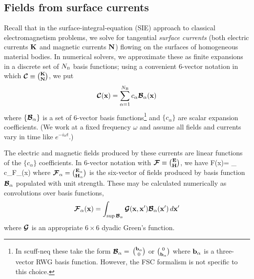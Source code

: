 \documentclass[letterpaper]{article}
\begin{document}
\newpage
\subsection*{Fields from surface currents}

Recall that in the surface-integral-equation (SIE) approach to
classical electromagnetism problems, we solve for tangential
\textit{surface currents} (both electric currents $\mathbf{K}$ 
and magnetic currents $\mathbf{N}$) flowing on the surfaces of 
homogeneous material bodies. In numerical solvers, we 
approximate these as finite expansions in a discrete set
of $N_{\hbox{\tiny{B}}}$ basis functions; using a convenient 6-vector notation 
in which $\boldsymbol{\mathcal{C}}\equiv {\mathbf{K} \choose \mathbf{N}}$, we put
$$ \boldsymbol{\mathcal{C}}(\mathbf{x})=\sum_{\alpha=1}^{N_{\hbox{\tiny{B}}}} 
   c_\alpha \boldsymbol{\mathcal{B}}_\alpha(\mathbf{x}) 
$$ 
where $\{\boldsymbol{\mathcal{B}}_\alpha\}$ is a set of 6-vector basis 
functions\footnote{In {\sc scuff-neq} these take the form
$\boldsymbol{\mathcal{B}}_\alpha=$ 
$\mathbf{b}_\alpha \choose 0$ 
or 
$0 \choose \mathbf{b}_\alpha$
where $\mathbf{b}_\alpha$ is a three-vector RWG basis function.
However, the FSC formalism is not specific to this choice.}
and $\{c_\alpha\}$ are scalar expansion coefficients.
(We work at a fixed frequency $\omega$ and assume all fields
and currents vary in time like $e^{-i\omega t}$.)

The electric and magnetic fields produced by these currents
are linear functions of the $\{c_\alpha\}$ coefficients.
In 6-vector notation with $\boldsymbol{\mathcal{F}}\equiv {\mathbf{E} \choose \mathbf{H}}$, we have
{ \bmc F(\vb x)=
   \sum_{\alpha} c_\alpha \bmc F_\alpha(\vb x)
}
where $\boldsymbol{\mathcal{F}}_\alpha={\mathbf{E}_\alpha \choose \mathbf{H}_\alpha}$ 
is the six-vector of fields produced by basis function $\boldsymbol{\mathcal{B}}_\alpha$ 
populated with unit strength. These may be calculated numerically
as convolutions over basis functions,
$$ \boldsymbol{\mathcal{F}}_\alpha(\mathbf{x})
   =\int_{\sup \boldsymbol{\mathcal{B}}_\alpha} \boldsymbol{\mathcal{G}}(\mathbf{x}, \mathbf{x}^\prime)
    \boldsymbol{\mathcal{B}}_\alpha(\mathbf{x}^\prime) \, d\mathbf{x}^\prime
$$
where $\boldsymbol{\mathcal{G}}$ is an appropriate $6\times 6$ dyadic Green's
function.
\end{document}
